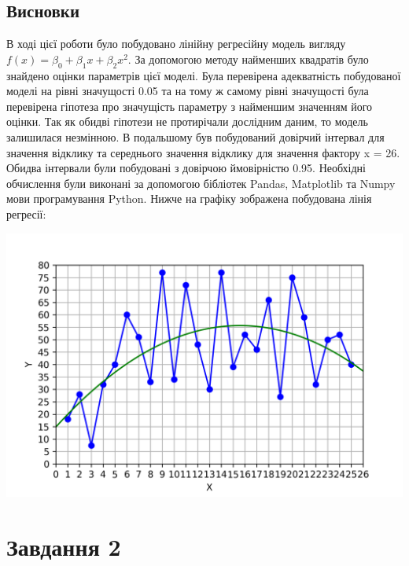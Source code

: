 \documentclass{article}
\begin{document}
    \subsection{Висновки}
      В ході цієї роботи було побудовано лінійну регресійну модель вигляду 
      $f(x) = \beta_0 + \beta_1 x + \beta_2 x^2$. За допомогою методу найменших 
      квадратів було знайдено оцінки параметрів цієї моделі. Була перевірена 
      адекватність побудованої моделі на рівні значущості 0.05 та на тому ж самому 
      рівні значущості була перевірена гіпотеза про значущість параметру з 
      найменшим значенням його оцінки. Так як обидві гіпотези не протирічали 
      дослідним даним, то модель залишилася незмінною. В подальшому був побудований 
      довірчий інтервал для значення відклику та середнього значення відклику для значення 
      фактору x = 26. Обидва інтервали були побудовані з довірчою ймовірністю 0.95.
      Необхідні обчислення були виконані за допомогою бібліотек Pandas, Matplotlib та 
      Numpy мови програмування Python. Нижче на графіку зображена побудована лінія 
      регресії:
      \begin{center}
        \includegraphics[scale=0.8]{task1_fin.png}
      \end{center}
  \newpage
  \section{Завдання 2}
\end{document}
